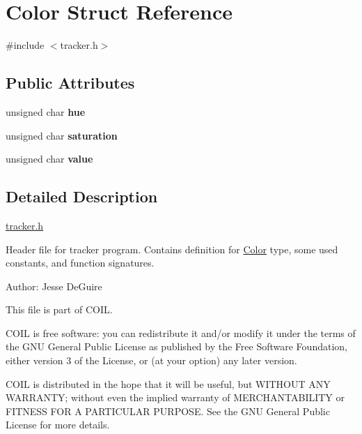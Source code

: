 \hypertarget{structColor}{\section{\-Color \-Struct \-Reference}
\label{structColor}
}


{\ttfamily \#include $<$tracker.\-h$>$}

\subsection*{\-Public \-Attributes}
\begin{DoxyCompactItemize}
\item 
\hypertarget{structColor_acd3566bf1dcd6e234b34f153f8faeb02}{unsigned char {\bfseries hue}}\label{structColor_acd3566bf1dcd6e234b34f153f8faeb02}

\item 
\hypertarget{structColor_aee5e9b18d8a816ae19d075b00593c9b4}{unsigned char {\bfseries saturation}}\label{structColor_aee5e9b18d8a816ae19d075b00593c9b4}

\item 
\hypertarget{structColor_a612eee7e42a847778cf4affb3816350a}{unsigned char {\bfseries value}}\label{structColor_a612eee7e42a847778cf4affb3816350a}

\end{DoxyCompactItemize}


\subsection{\-Detailed \-Description}
\hyperlink{tracker_8h_source}{tracker.\-h}

\-Header file for tracker program. \-Contains definition for \hyperlink{structColor}{\-Color} type, some used constants, and function signatures.

\-Author\-: \-Jesse \-De\-Guire

\-This file is part of \-C\-O\-I\-L.

\-C\-O\-I\-L is free software\-: you can redistribute it and/or modify it under the terms of the \-G\-N\-U \-General \-Public \-License as published by the \-Free \-Software \-Foundation, either version 3 of the \-License, or (at your option) any later version.

\-C\-O\-I\-L is distributed in the hope that it will be useful, but \-W\-I\-T\-H\-O\-U\-T \-A\-N\-Y \-W\-A\-R\-R\-A\-N\-T\-Y; without even the implied warranty of \-M\-E\-R\-C\-H\-A\-N\-T\-A\-B\-I\-L\-I\-T\-Y or \-F\-I\-T\-N\-E\-S\-S \-F\-O\-R \-A \-P\-A\-R\-T\-I\-C\-U\-L\-A\-R \-P\-U\-R\-P\-O\-S\-E. \-See the \-G\-N\-U \-General \-Public \-License for more details.

